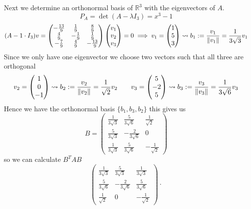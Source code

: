\begin{example}
   Next we determine an orthonormal basis of \(\mathbb{R}^3\) with the eigenvectors of \(A\).
   \[P_A = \det(A - \lambda I_3) = x^3 - 1\]
   \[(A - 1 \cdot I_3)v =
      \begin{pmatrix}
         -\frac{13}{9} & \frac{1}{9} & \frac{8}{9}\\
         \frac{4}{9} & -\frac{1}{9} & \frac{1}{9}\\
         -\frac{7}{9} & \frac{4}{9} & -\frac{13}{9}
         \end{pmatrix} \begin{pmatrix}v_1\\v_2\\v_3\end{pmatrix} = 0 \implies v_1 = \begin{pmatrix}1\\5\\3\end{pmatrix} \rightsquigarrow b_1 := \frac{v_1}{\left\lVert v_1\right\rVert} = \frac{1}{3\sqrt{3}}v_1
   \]
   Since we only have one eigenvector we choose two vectors such that all three are orthogonal
   \[v_2 = \begin{pmatrix}1\\0\\-1\end{pmatrix} \rightsquigarrow b_2 := \frac{v_2}{\left\lVert v_2\right\rVert} = \frac{1}{\sqrt{2}}v_2 \qquad v_3 = \begin{pmatrix}5\\-2\\5\end{pmatrix} \rightsquigarrow b_3 := \frac{v_3}{\left\lVert v_3\right\rVert} = \frac{1}{3\sqrt{6}}v_3\]
   Hence we have the orthonormal basis \(\{b_1, b_3, b_2\}\) this gives us
   \[B = \begin{pmatrix}
         \frac{1}{3\sqrt{3}} & \frac{5}{3\sqrt{6}} & \frac{1}{\sqrt{2}}\\
         \frac{5}{3\sqrt{3}} & -\frac{2}{3\sqrt{6}} & 0\\
         \frac{1}{3\sqrt{3}} & \frac{5}{3\sqrt{6}} & -\frac{1}{\sqrt{2}}
   \end{pmatrix}\]
   so we can calculate \(B^TAB\)
   \[
      \begin{pmatrix}
         \frac{1}{3\sqrt{3}} & \frac{5}{3\sqrt{3}}  & \frac{1}{3\sqrt{3}}\\
         \frac{5}{3\sqrt{6}} & -\frac{2}{3\sqrt{6}} & \frac{5}{3\sqrt{6}}\\
         \frac{1}{\sqrt{2}}  & 0                    & -\frac{1}{\sqrt{2}}
      \end{pmatrix} \cdot
\]
\end{example}
